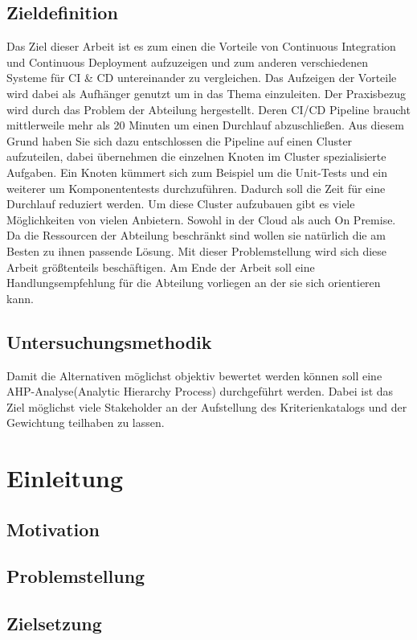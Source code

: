 \section{Zieldefinition}
Das Ziel dieser Arbeit ist es zum einen die Vorteile von Continuous Integration und Continuous Deployment aufzuzeigen und zum anderen verschiedenen Systeme für CI \& CD untereinander zu vergleichen. Das Aufzeigen der Vorteile wird dabei als Aufhänger genutzt um in das Thema einzuleiten. Der Praxisbezug wird durch das Problem der Abteilung hergestellt. Deren CI/CD Pipeline braucht mittlerweile mehr als 20 Minuten um einen Durchlauf abzuschließen. Aus diesem Grund haben Sie sich dazu entschlossen die Pipeline auf einen Cluster aufzuteilen, dabei übernehmen die einzelnen Knoten im Cluster spezialisierte Aufgaben. Ein Knoten kümmert sich zum Beispiel um die Unit-Tests und ein weiterer um Komponententests durchzuführen. Dadurch soll die Zeit für eine Durchlauf reduziert werden. Um diese Cluster aufzubauen gibt es viele Möglichkeiten von vielen Anbietern. Sowohl in der Cloud als auch On Premise. Da die Ressourcen der Abteilung beschränkt sind wollen sie natürlich die am Besten zu ihnen passende Lösung. Mit dieser Problemstellung wird sich diese Arbeit größtenteils beschäftigen. Am Ende der Arbeit soll eine Handlungsempfehlung für die Abteilung vorliegen an der sie sich orientieren kann.
\section{Untersuchungsmethodik}
Damit die Alternativen möglichst objektiv bewertet werden können soll eine AHP-Analyse(Analytic Hierarchy Process) durchgeführt werden. Dabei ist das Ziel möglichst viele Stakeholder an der Aufstellung des Kriterienkatalogs und der Gewichtung teilhaben zu lassen.
\chapter{Einleitung} 
\section{Motivation} 
\section{Problemstellung} 
\section{Zielsetzung} 

